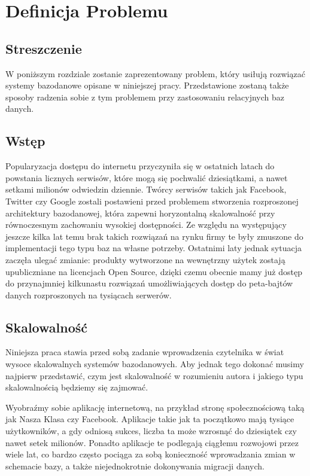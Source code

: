 \chapter{Definicja Problemu}

\section*{Streszczenie}
W poniższym rozdziale zostanie zaprezentowany problem, który usiłują rozwiązać systemy bazodanowe opisane w niniejszej pracy.
Przedstawione zostaną także sposoby radzenia sobie z tym problemem przy zastosowaniu relacyjnych baz danych.

\section{Wstęp}
Popularyzacja dostępu do internetu przyczyniła się w ostatnich latach do  powstania licznych serwisów, które mogą się pochwalić dziesiątkami, a nawet setkami milionów odwiedzin dziennie. 
Twórcy serwisów takich jak Facebook, Twitter czy Google zostali postawieni przed problemem stworzenia rozproszonej architektury bazodanowej, która zapewni horyzontalną skalowalność przy równoczesnym zachowaniu wysokiej dostępności. 
Ze względu na występujący jeszcze kilka lat temu brak takich rozwiązań na rynku firmy te były zmuszone do implementacji tego typu baz na własne potrzeby. 
Ostatnimi laty jednak sytuacja zaczęła ulegać zmianie: produkty wytworzone na wewnętrzny użytek zostają upubliczniane na licencjach Open Source, dzięki czemu obecnie mamy już dostęp do przynajmniej kilkunastu rozwiązań umożliwiających dostęp do peta-bajtów danych rozproszonych na tysiącach serwerów.

\section{Skalowalność}
Niniejsza praca stawia przed sobą zadanie wprowadzenia czytelnika w świat wysoce skalowalnych systemów bazodanowych.
Aby jednak tego dokonać musimy najpierw przedstawić, czym jest skalowalność w rozumieniu autora i jakiego typu skalowalnością będziemy się zajmować.

Wyobraźmy sobie aplikację internetową, na przykład stronę społecznościową taką jak Nasza Klasa czy Facebook.
Aplikacje takie jak ta początkowo mają tysiące użytkowników, a gdy odniosą sukces, liczba ta może wzrosnąć do dziesiątek czy nawet setek milionów.
Ponadto aplikacje te podlegają ciągłemu rozwojowi przez wiele lat, co bardzo często pociąga za sobą konieczność wprowadzania zmian w schemacie bazy, a także niejednokrotnie dokonywania migracji danych.

